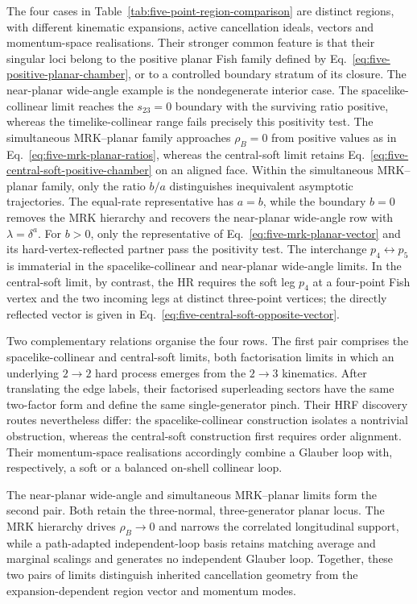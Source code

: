 \documentclass[a4paper,11pt]{article}
\begin{document}
The four cases in Table~\ref{tab:five-point-region-comparison} are distinct
regions, with different kinematic expansions, active cancellation ideals,
vectors and momentum-space realisations.  Their stronger common feature is that their
singular loci belong to the positive planar Fish family defined by
Eq.~\eqref{eq:five-positive-planar-chamber}, or to a controlled boundary
stratum of its closure.  The near-planar wide-angle example is the
nondegenerate interior case.  The spacelike-collinear limit reaches the
\(s_{23}=0\) boundary with the surviving ratio positive, whereas the
timelike-collinear range fails precisely this positivity test.  The
simultaneous MRK--planar family approaches \(\rho_B=0\) from positive
values as in Eq.~\eqref{eq:five-mrk-planar-ratios}, whereas the central-soft
limit retains Eq.~\eqref{eq:five-central-soft-positive-chamber} on an aligned
face.
Within the simultaneous MRK--planar family, only the ratio \(b/a\)
distinguishes inequivalent asymptotic trajectories.  The equal-rate
representative has \(a=b\), while the boundary \(b=0\) removes the MRK
hierarchy and recovers the near-planar wide-angle row with
\(\lambda=\delta^a\).  For \(b>0\), only the representative of
Eq.~\eqref{eq:five-mrk-planar-vector} and its hard-vertex-reflected partner pass
the positivity test.  The interchange \(p_4\leftrightarrow p_5\) is
immaterial in the spacelike-collinear and near-planar wide-angle limits.  In
the central-soft limit, by contrast, the HR requires the soft leg \(p_4\) at
a four-point Fish vertex and the two incoming legs at distinct three-point
vertices; the directly reflected vector is given in
Eq.~\eqref{eq:five-central-soft-opposite-vector}.

Two complementary relations organise the four rows.  The first pair comprises
the spacelike-collinear and central-soft limits, both factorisation limits in
which an underlying \(2\to2\) hard process emerges from the \(2\to3\)
kinematics.  After translating the edge labels, their factorised
superleading sectors have the same two-factor form and define the same
single-generator pinch.  Their HRF discovery routes nevertheless differ:
the spacelike-collinear construction isolates a nontrivial obstruction,
whereas the central-soft construction first requires order alignment.  Their
momentum-space realisations accordingly combine a Glauber loop with,
respectively, a soft or a balanced on-shell collinear loop.

The near-planar wide-angle and simultaneous MRK--planar limits form the second
pair.  Both retain the three-normal, three-generator planar
locus.  The MRK hierarchy drives \(\rho_B\to0\) and narrows the correlated
longitudinal support, while a path-adapted independent-loop basis retains
matching average and marginal scalings and generates no independent Glauber
loop.  Together, these two pairs of limits distinguish inherited cancellation
geometry from the expansion-dependent region vector and momentum modes.
\end{document}
